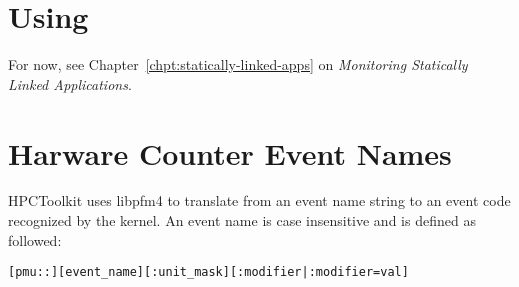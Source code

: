 
\section{Using \hpclink{}}

For now, see Chapter~\ref{chpt:statically-linked-apps} on {\it
Monitoring Statically Linked Applications}.


\section{Harware Counter Event Names}

HPCToolkit uses libpfm4\cite{libpfm-www} to translate from an event name string to an event code recognized by the kernel. 
An event name is case insensitive and is defined as followed:
\begin{verbatim}
[pmu::][event_name][:unit_mask][:modifier|:modifier=val] 
\end{verbatim}

